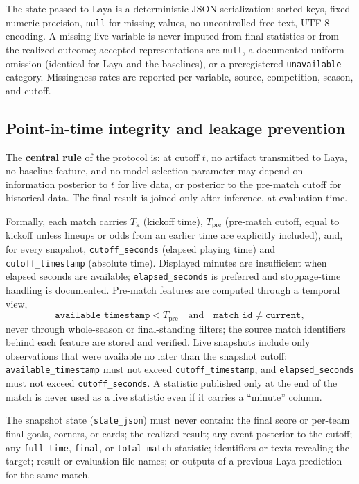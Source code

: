 \documentclass[11pt]{article}
\begin{document}
The state passed to Laya is a deterministic JSON serialization: sorted keys,
fixed numeric precision, \texttt{null} for missing values, no uncontrolled
free text, UTF-8 encoding. A missing live variable is never imputed from
final statistics or from the realized outcome; accepted representations are
\texttt{null}, a documented uniform omission (identical for Laya and the
baselines), or a preregistered \texttt{unavailable} category. Missingness
rates are reported per variable, source, competition, season, and cutoff.

\subsection{Point-in-time integrity and leakage prevention}
\label{sec:leak}

The \textbf{central rule} of the protocol is: at cutoff $t$, no artifact
transmitted to Laya, no baseline feature, and no model-selection parameter
may depend on information posterior to $t$ for live data, or posterior to the
pre-match cutoff for historical data. The final result is joined only after
inference, at evaluation time.

Formally, each match carries $T_{\mathrm{k}}$ (kickoff time),
$T_{\mathrm{pre}}$ (pre-match cutoff, equal to kickoff unless lineups or odds
from an earlier time are explicitly included), and, for every snapshot,
\texttt{cutoff\_seconds} (elapsed playing time) and \texttt{cutoff\_timestamp}
(absolute time). Displayed minutes are insufficient when elapsed seconds are
available; \texttt{elapsed\_seconds} is preferred and stoppage-time handling is
documented. Pre-match features are computed through a temporal view,
\begin{equation}
\texttt{available\_timestamp} < T_{\mathrm{pre}}
\quad\text{and}\quad
\texttt{match\_id} \neq \texttt{current},
\label{eq:prematch}
\end{equation}
never through whole-season or final-standing filters; the source match
identifiers behind each feature are stored and verified. Live snapshots
include only observations that were available no later than the snapshot
cutoff: \texttt{available\_timestamp} must not exceed
\texttt{cutoff\_timestamp}, and \texttt{elapsed\_seconds} must not exceed
\texttt{cutoff\_seconds}. A statistic published
only at the end of the match is never used as a live statistic even if it
carries a ``minute'' column.

The snapshot state (\texttt{state\_json}) must never contain: the final score
or per-team final goals, corners, or cards; the realized result; any event
posterior to the cutoff; any \texttt{full\_time}, \texttt{final}, or
\texttt{total\_match} statistic; identifiers or texts revealing the target;
result or evaluation file names; or outputs of a previous Laya prediction for
the same match.
\end{document}
